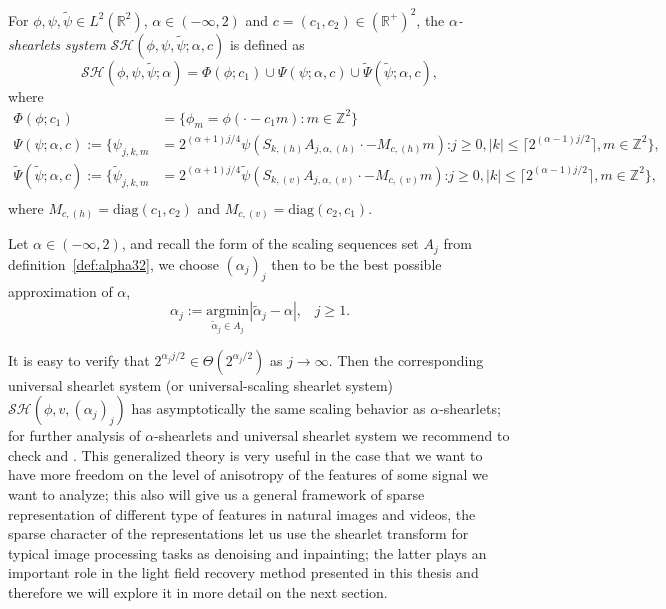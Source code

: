 \begin{defn}
\label{def:alphashearlets}
For $\phi,\psi,\tilde{\psi}\in L^2(\mathbb{R}^2)$, $\alpha\in (-\infty,2)$ and $c=(c_1,c_2)\in (\mathbb{R}^+)^2$, the \textit{$\alpha$-shearlets system} $\mathcal{SH}(\phi,\psi,\tilde{\psi};\alpha,c)$ is defined as
$$
\mathcal{SH}(\phi,\psi,\tilde{\psi};\alpha)=\Phi(\phi;c_1)\cup\Psi(\psi;\alpha,c)\cup\tilde{\Psi}(\tilde{\psi};\alpha,c),
$$
where
$$
\begin{aligned}
\Phi(\phi;c_1)&=\{\phi_m=\phi(\cdot-c_1m):m\in\mathbb{Z}^2\}\\
\Psi(\psi;\alpha,c):=\{\psi_{j,k,m}&=2^{(\alpha+1)j/4}\psi(S_{k,(h)}A_{j,\alpha,(h)}\cdot-M_{c,(h)}m)\textrm{:}j\geq 0,|k|\leq \lceil 2^{(\alpha-1)j/2}\rceil,m\in\mathbb{Z}^2\},\\
\tilde{\Psi}(\tilde{\psi};\alpha,c):=\{\tilde{\psi}_{j,k,m}&=2^{(\alpha+1)j/4}\tilde{\psi}(S_{k,(v)}A_{j,\alpha,(v)}\cdot-M_{c,(v)}m)\textrm{:}j\geq 0,|k|\leq \lceil 2^{(\alpha-1)j/2}\rceil,m\in\mathbb{Z}^2\},\\
\end{aligned}
$$
where $M_{c,(h)}=\text{diag}(c_1,c_2)$ and $M_{c,(v)}=\text{diag}(c_2,c_1)$.
\end{defn}

Let $\alpha\in (-\infty,2)$, and recall the form of the scaling sequences set $A_j$ from definition~\ref{def:alpha32}, we choose $(\alpha_j)_j$ then to be the best possible approximation of $\alpha$, 
$$
\alpha_j:=\underset{\tilde{\alpha}_j\in A_j}{\text{argmin}}|\tilde{\alpha}_j-\alpha|\textrm{,}\quad j\geq 1.
$$

It is easy to verify that $2^{\alpha_j j/2}\in\Theta(2^{\alpha_j/2})$ as $j\longrightarrow \infty$. Then the corresponding universal shearlet system (or universal-scaling shearlet system) $\mathcal{SH}(\phi,v,(\alpha_j)_j)$ has asymptotically the same scaling behavior as $\alpha$-shearlets; for further analysis of $\alpha$-shearlets and universal shearlet system we recommend to check \cite{Gitta-alpha} and \cite{firstalpha}. This generalized theory is very useful in the case that we want to have more freedom on the level of anisotropy of the features of some signal we want to analyze; this also will give us a general framework of sparse representation of different type of features in natural images and videos, the sparse character of the representations let us use the shearlet transform for typical image processing tasks as denoising and inpainting; the latter plays an important role in the light field recovery method presented in this thesis and therefore we will explore it in more detail on the next section.

